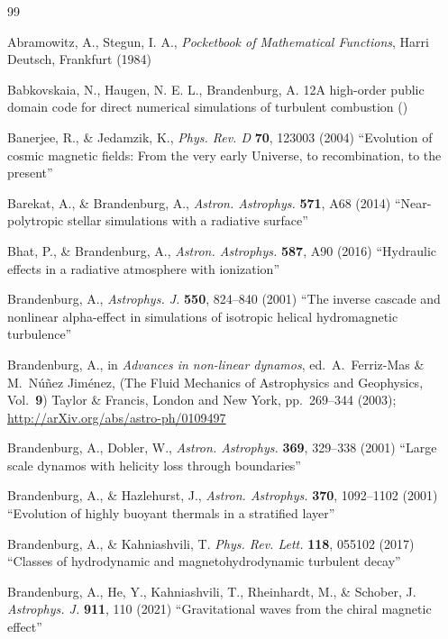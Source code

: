 \documentclass[\mydriver,12pt,twoside,notitlepage,a4paper]{article}
\begin{document}
\begin{thebibliography}{99}

 Abramowitz, A., Stegun, I. A.,
  \emph{Pocketbook of Mathematical Functions\/},
  Harri Deutsch, Frankfurt (1984)

 Babkovskaia, N., Haugen, N. E. L., Brandenburg, A.
{12}{A high-order public domain code for direct numerical simulations of turbulent combustion}
()

Banerjee, R., \& Jedamzik, K.,
  \emph{Phys. Rev. D} \textbf{70}, 123003 (2004)
  ``Evolution of cosmic magnetic fields: From the very early Universe, to recombination, to the present''

 Barekat, A., \& Brandenburg, A.,
  \emph{Astron. Astrophys.} \textbf{571}, A68 (2014)
  ``Near-polytropic stellar simulations with a radiative surface''

 Bhat, P., \& Brandenburg, A.,
  \emph{Astron. Astrophys.} \textbf{587}, A90 (2016)
  ``Hydraulic effects in a radiative atmosphere with ionization''

 Brandenburg, A.,
  \emph{Astrophys. J.} \textbf{550}, 824--840 (2001)
  ``The inverse cascade and nonlinear alpha-effect in simulations
  of isotropic helical hydromagnetic turbulence''

 Brandenburg, A., in \emph{Advances in non-linear dynamos},
  ed.\ A.\ Ferriz-Mas \& M.\ N\'u\~nez Jim\'enez,
  (The Fluid Mechanics of Astrophysics and Geophysics, Vol.\ {\bf9})
  Taylor \& Francis, London and New York, pp.~269--344 (2003);
  \url{http://arXiv.org/abs/astro-ph/0109497}

 Brandenburg, A., Dobler, W.,
  \emph{Astron. Astrophys.} \textbf{369}, 329--338 (2001)
  ``Large scale dynamos with helicity loss through boundaries''

 Brandenburg, A., \& Hazlehurst, J.,
  \emph{Astron. Astrophys.} \textbf{370}, 1092--1102 (2001)
  ``Evolution of highly buoyant thermals in a stratified layer''

 Brandenburg, A., \& Kahniashvili, T.
  \emph{Phys. Rev. Lett.} \textbf{118}, 055102 (2017)
  ``Classes of hydrodynamic and magnetohydrodynamic turbulent decay''

 Brandenburg, A., He, Y., Kahniashvili, T., Rheinhardt, M., \& Schober, J.
  \emph{Astrophys. J.} \textbf{911}, 110 (2021)
  ``Gravitational waves from the chiral magnetic effect''


\end{thebibliography}
\end{document}
